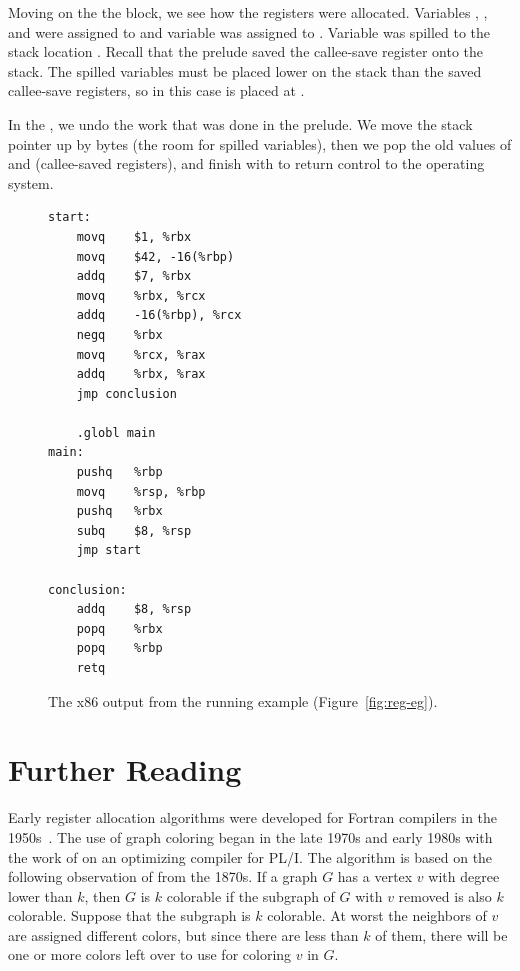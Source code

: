 \documentclass[11pt]{book}
\begin{document}
{Moving on the the  block, we see how the registers were
allocated. Variables , , and  were assigned to
 and variable  was assigned to .  Variable
 was spilled to the stack location .  Recall
that the prelude saved the callee-save register  onto the
stack. The spilled variables must be placed lower on the stack than
the saved callee-save registers, so in this case  is placed at
.

In the , we undo the work that was
done in the prelude. We move the stack pointer up by  bytes
(the room for spilled variables), then we pop the old values of
 and  (callee-saved registers), and finish with
 to return control to the operating system.

  
\begin{figure}[tbp]
\begin{lstlisting}
start:
	movq	$1, %rbx
	movq	$42, -16(%rbp)
	addq	$7, %rbx
	movq	%rbx, %rcx
	addq	-16(%rbp), %rcx
	negq	%rbx
	movq	%rcx, %rax
	addq	%rbx, %rax
	jmp conclusion

	.globl main
main:
	pushq	%rbp
	movq	%rsp, %rbp
	pushq	%rbx
	subq	$8, %rsp
	jmp start
        
conclusion:
	addq	$8, %rsp
	popq	%rbx
	popq	%rbp
	retq
\end{lstlisting}
\caption{The x86 output from the running example (Figure~\ref{fig:reg-eg}).}
\label{fig:running-example-x86}
\end{figure}




\section{Further Reading}
\label{sec:register-allocation-further-reading}

Early register allocation algorithms were developed for Fortran
compilers in the 1950s~\citep{Horwitz:1966aa,Backus:1978aa}.  The use
of graph coloring began in the late 1970s and early 1980s with the
work of \citet{Chaitin:1981vl} on an optimizing compiler for PL/I. The
algorithm is based on the following observation of
\citet{Kempe:1879aa} from the 1870s.  If a graph $G$ has a vertex $v$
with degree lower than $k$, then $G$ is $k$ colorable if the subgraph
of $G$ with $v$ removed is also $k$ colorable. Suppose that the
subgraph is $k$ colorable.  At worst the neighbors of $v$ are assigned
different colors, but since there are less than $k$ of them, there
will be one or more colors left over to use for coloring $v$ in $G$.

}
\end{document}
